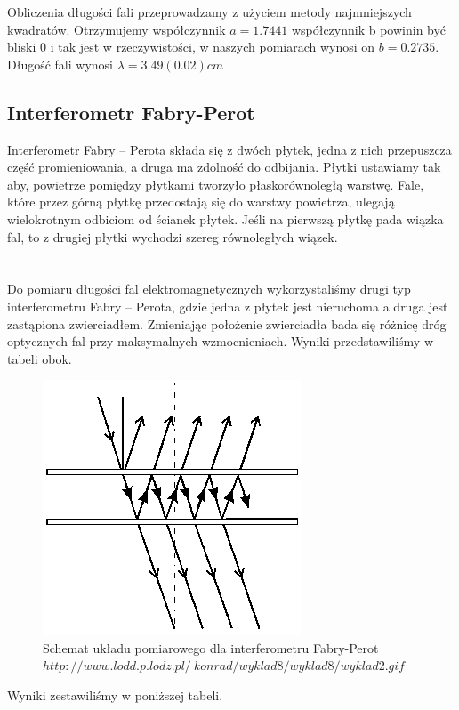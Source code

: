 \documentclass[a4paper]{article}
\newlength{\du}
\begin{document}
Obliczenia długości fali przeprowadzamy z użyciem metody najmniejszych kwadratów. Otrzymujemy współczynnik $a = 1.7441$ współczynnik b powinin być bliski 0 i tak jest w rzeczywistości, w naszych pomiarach wynosi on $b=0.2735$. Długość fali wynosi $\lambda = 3.49(0.02)cm$


\subsection{Interferometr Fabry-Perot}
Interferometr Fabry – Perota składa się z dwóch płytek, jedna z nich przepuszcza część promieniowania, a druga ma zdolność do odbijania. Płytki ustawiamy tak aby, powietrze pomiędzy płytkami tworzyło płaskorównoległą warstwę. Fale, które przez górną płytkę przedostają się do warstwy powietrza, ulegają wielokrotnym odbiciom od ścianek płytek. Jeśli na pierwszą płytkę pada wiązka fal, to z drugiej płytki wychodzi szereg równoległych wiązek. 
\\
\\
\\
Do pomiaru długości fal elektromagnetycznych wykorzystaliśmy drugi typ interferometru Fabry – Perota, gdzie jedna z płytek jest nieruchoma a druga jest zastąpiona zwierciadłem. Zmieniając położenie zwierciadła bada się różnicę dróg optycznych fal przy maksymalnych wzmocnieniach. Wyniki przedstawiliśmy w tabeli obok.

\begin{figure}[h!]
\centering
\includegraphics[scale=0.7]{fabry_perot.png}
\caption{Schemat układu pomiarowego dla interferometru Fabry-Perot $http://www.lodd.p.lodz.pl/~konrad/wyklad8/wyklad8/wyklad2.gif$}
\label{fabry_perot}
\end{figure}

Wyniki zestawiliśmy w poniższej tabeli. 
\end{document}
